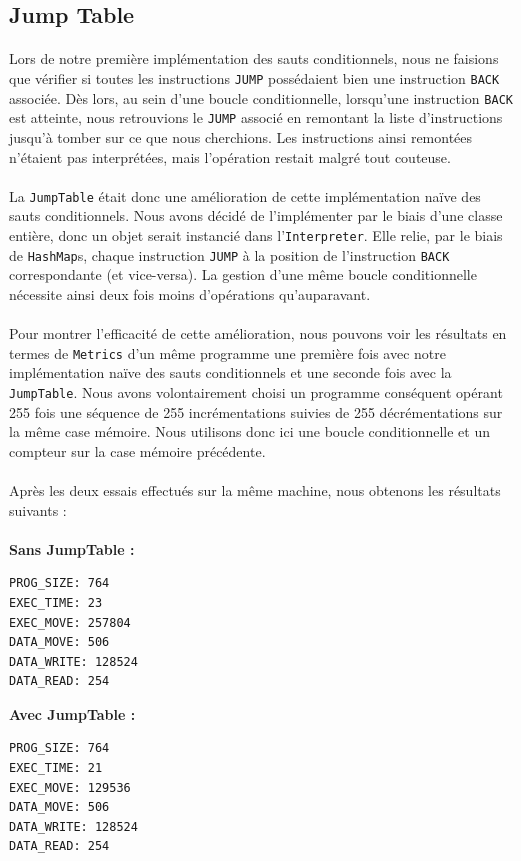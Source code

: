 \documentclass[a4paper]{article}
\begin{document}
\subsection{Jump Table}
\paragraph{}Lors de notre première implémentation des sauts conditionnels, nous ne faisions que vérifier si toutes les instructions \texttt{JUMP} possédaient bien une instruction \texttt{BACK} associée. Dès lors, au sein d'une boucle conditionnelle, lorsqu'une instruction \texttt{BACK} est atteinte, nous retrouvions le \texttt{JUMP} associé en remontant la liste d'instructions jusqu'à tomber sur ce que nous cherchions. Les instructions ainsi remontées n'étaient pas interprétées, mais l'opération restait malgré tout couteuse.

\paragraph{}La \texttt{JumpTable} était donc une amélioration de cette implémentation naïve des sauts conditionnels. Nous avons décidé de l'implémenter par le biais d'une classe entière, donc un objet serait instancié dans l'\texttt{Interpreter}. Elle relie, par le biais de \texttt{HashMap}s, chaque instruction \texttt{JUMP} à la position de l'instruction \texttt{BACK} correspondante (et vice-versa). La gestion d'une même boucle conditionnelle nécessite ainsi deux fois moins d'opérations qu'auparavant.

\paragraph{}Pour montrer l'efficacité de cette amélioration, nous pouvons voir les résultats en termes de \texttt{Metrics} d'un même programme une première fois avec notre implémentation naïve des sauts conditionnels et une seconde fois avec la \texttt{JumpTable}.  Nous avons volontairement choisi un programme conséquent opérant 255 fois une séquence de 255 incrémentations suivies de 255 décrémentations sur la même case mémoire. Nous utilisons donc ici une boucle conditionnelle et un compteur sur la case mémoire précédente.
\paragraph{}Après les deux essais effectués sur la même machine, nous obtenons les résultats suivants :\\\\
\textbf{Sans JumpTable :}
\begin{verbatim}
PROG_SIZE: 764
EXEC_TIME: 23
EXEC_MOVE: 257804
DATA_MOVE: 506
DATA_WRITE: 128524
DATA_READ: 254
\end{verbatim}
\textbf{Avec JumpTable : }
\begin{verbatim}
PROG_SIZE: 764
EXEC_TIME: 21
EXEC_MOVE: 129536
DATA_MOVE: 506
DATA_WRITE: 128524
DATA_READ: 254
\end{verbatim}
\end{document}
